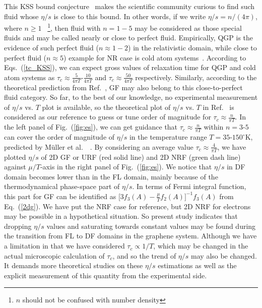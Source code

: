 \documentclass[amsmath,amssymb,aps,prb]{revtex4-2}
\begin{document}
%
    This KSS bound conjecture~\cite{25Kovtun:2004de} makes the scientific community curious to find such fluid whose $\eta/s$ is close to this bound. In other words, if we write $\eta/s=n/(4\pi)$, where $n\geq 1$~ \footnote{$n$ should not be confused with number density}, then fluid with $n=1-5$ may be considered as those special fluids and may be called nearly or close to perfect fluid. Empirically, QGP is the evidence of such perfect fluid ($n\approx 1-2$) in the relativistic domain, while close to perfect fluid ($n\approx 5$) example for NR case is cold atom systems~\cite{27Sch_fer_2009}. According to Eqs.~(\ref{tc_KSS}), we can expect gross values of relaxation time for QGP and cold atom systems as $\tau_c\approx\frac{5}{4\pi T}$-$\frac{10}{4\pi T}$ and $\tau_c\approx\frac{50}{4\pi T}$ respectively. 
    Similarly, according to the theoretical prediction from Ref.~\cite{24PhysRevLett.103.025301}, GF may also belong to this close-to-perfect fluid category. So far, to the best of our knowledge, no experimental measurement of $\eta/s$ vs. $T$ plot is available, so the theoretical plot of $\eta/s$ vs. $T$ in Ref.~\cite{24PhysRevLett.103.025301} is considered as our reference to guess or tune order of magnitude for $\tau_c\approx\frac{n}{\pi T}$. In the left panel of Fig.~(\ref{fig:es}), we can get guidance that $\tau_c\approx\frac{n}{\pi T}$ within $n=3$-$5$ can cover the order of magnitude of $\eta/s$ in the temperature range $T=35$-$150^\circ$K, predicted by Müller et al.~~\cite{24PhysRevLett.103.025301}. By considering an average value $\tau_c\approx\frac{4}{\pi T}$, we have plotted $\eta/s$ of 2D GF or URF (red solid line) and 2D NRF (green dash line) against $\mu/T$-axis in the right panel of Fig.~(\ref{fig:es}).
    We notice that $\eta/s$ in DF domain becomes lower than in the FL domain, mainly because of the thermodynamical phase-space part of $\eta/s$. In terms of Fermi integral function, this part for GF can be identified as $\Big[3f_3\left(A\right) - \frac{\mu}{T} f_2\left(A\right) \Big]^{-1} f_3\left(A\right)$ from Eq.~(\ref{2dg}).
    We have put the NRF case for reference, but 2D NRF for electrons may be possible in a hypothetical situation. So present study indicates that dropping $\eta/s$ values and saturating towards constant values may be found during the transition from FL to DF domains in the graphene system.
    Although we have a limitation in that we have considered $\tau_c\propto 1/T$, which may be changed in the actual microscopic calculation of $\tau_c$, and so the trend of $\eta/s$ may also be changed. It demands more theoretical studies on these $\eta/s$ estimations as well as the explicit measurement of this quantity from the experimental side.
\end{document}
